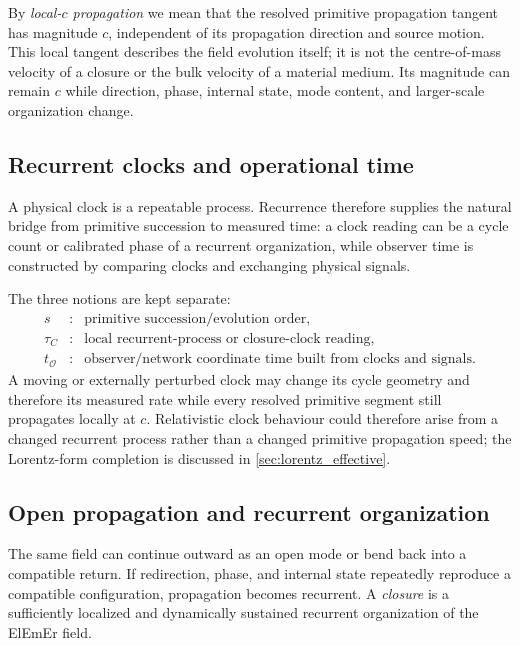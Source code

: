 \documentclass[11pt]{article}
\theoremstyle{definition}
\newcommand{\ElEmEr}{\mbox{ElEmEr}}
\begin{document}
By \emph{local-$c$ propagation} we mean that the resolved primitive propagation tangent
has magnitude $c$, independent of its propagation direction and source motion.  This
local tangent describes the field evolution itself; it is not the centre-of-mass velocity
of a closure or the bulk velocity of a material medium.  Its magnitude can remain $c$ while direction,
phase, internal state, mode content, and larger-scale organization change.

\subsection{Recurrent clocks and operational time}
\label{subsec:operational_time}

A physical clock is a repeatable process.  Recurrence therefore supplies the natural
bridge from primitive succession to measured time: a clock reading can be a cycle count
or calibrated phase of a recurrent organization, while observer time is constructed by
comparing clocks and exchanging physical signals.

The three notions are kept separate:
\begin{equation}
\boxed{
\begin{array}{rcl}
 s &:& \text{primitive succession/evolution order},\\
 \tau_C &:& \text{local recurrent-process or closure-clock reading},\\
 t_{\mathcal O} &:& \text{observer/network coordinate time built from clocks and signals}.
\end{array}}
\label{eq:three_times}
\end{equation}
A moving or externally perturbed clock may change its cycle geometry and therefore its
measured rate while every resolved primitive segment still propagates locally at $c$.
Relativistic clock behaviour could therefore arise from a changed recurrent process rather
than a changed primitive propagation speed; the Lorentz-form completion is discussed in
\cref{sec:lorentz_effective}.

\subsection{Open propagation and recurrent organization}
\label{subsec:open_closed_premise}

The same field can continue outward as an open mode or bend back into a compatible
return.  If redirection, phase, and internal state repeatedly reproduce a compatible
configuration, propagation becomes recurrent.  A \emph{closure} is a sufficiently
localized and dynamically sustained recurrent organization of the \ElEmEr{} field.
\end{document}

